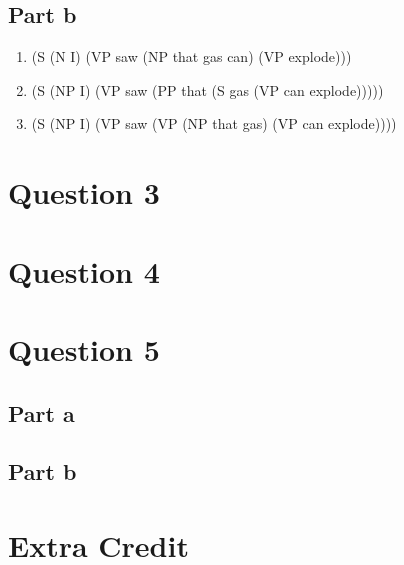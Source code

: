 \documentclass[10pt]{article}
\begin{document}
\subsection*{Part b}
\noindent
\begin{enumerate}
\item
(S
	(N I)
	(VP saw
		(NP that
			gas can)
		(VP explode)))

\item 
(S
	(NP I)
	(VP saw
		(PP that
			(S gas
				(VP can
					explode)))))

\item
(S
	(NP I)
	(VP saw
		(VP (NP that
				gas)
			(VP can
				explode))))

\end{enumerate}

\section*{Question 3}

\section*{Question 4}

\section*{Question 5}

\subsection*{Part a}

\subsection*{Part b}

\section*{Extra Credit}
\end{document}
